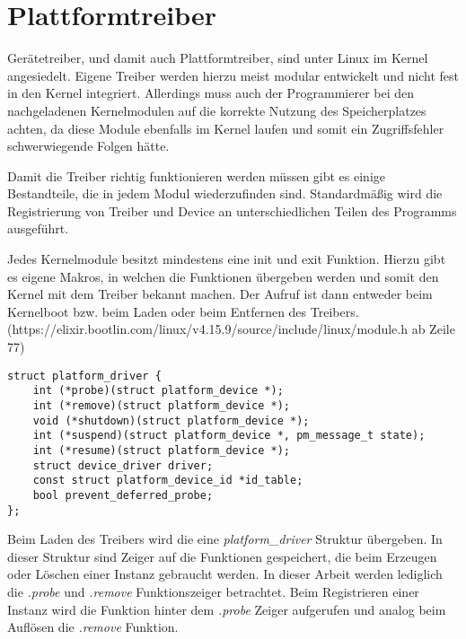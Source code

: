 \section{Plattformtreiber}\label{sec:plat_t}
Gerätetreiber, und damit auch Plattformtreiber, sind unter Linux im Kernel angesiedelt. Eigene Treiber werden hierzu meist modular entwickelt und nicht fest in den Kernel integriert. Allerdings muss auch der Programmierer bei den nachgeladenen Kernelmodulen auf die korrekte Nutzung des Speicherplatzes achten, da diese Module ebenfalls im Kernel laufen und somit ein Zugriffsfehler schwerwiegende Folgen hätte. \citep[S. 231ff]{schroder2009embedded}

Damit die Treiber richtig funktionieren werden müssen gibt es einige Bestandteile, die in jedem Modul wiederzufinden sind. Standardmäßig wird die Registrierung von Treiber und Device an unterschiedlichen Teilen des Programms ausgeführt. \cite{corbetplatform} 

Jedes Kernelmodule besitzt mindestens eine init und exit Funktion. Hierzu gibt es eigene Makros, in welchen die Funktionen übergeben werden und somit den Kernel mit dem Treiber bekannt machen. Der Aufruf ist dann entweder beim Kernelboot bzw. beim Laden oder beim Entfernen des Treibers.
(https://elixir.bootlin.com/linux/v4.15.9/source/include/linux/module.h ab Zeile 77)

\begin{lstlisting}
struct platform_driver {
	int (*probe)(struct platform_device *);
	int (*remove)(struct platform_device *);
	void (*shutdown)(struct platform_device *);
	int (*suspend)(struct platform_device *, pm_message_t state);
	int (*resume)(struct platform_device *);
	struct device_driver driver;
	const struct platform_device_id *id_table;
	bool prevent_deferred_probe;
};
\end{lstlisting}

Beim Laden des Treibers wird die eine \textit{platform\_driver} Struktur übergeben. In dieser Struktur sind Zeiger auf die Funktionen gespeichert, die beim Erzeugen oder Löschen einer Instanz gebraucht werden.  
In dieser Arbeit werden lediglich die \textit{.probe} und \textit{.remove} Funktionszeiger betrachtet. Beim Registrieren einer Instanz wird die Funktion hinter dem \textit{.probe} Zeiger aufgerufen und analog beim Auflösen die \textit{.remove} Funktion.\cite{corbetplatform} 

